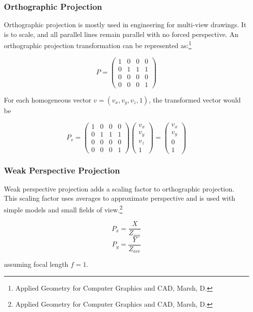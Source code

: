 \documentclass{article}
\begin{document}
\subsubsection{Orthographic Projection}
Orthographic projection is mostly used in engineering for multi-view drawings. It is to scale, and all parallel lines remain parallel with no forced perspective. An orthographic projection transformation can be represented as:\footnote{Applied Geometry for Computer Graphics and CAD, Marsh, D.}

\[ P = \begin{pmatrix}
  1 & 0 & 0 & 0 \\
  0 & 1 & 1 & 1 \\
  0 & 0 & 0 & 0 \\
  0 & 0 & 0 & 1 
 \end{pmatrix}\]	


For each homogeneous vector $v = (v_x, v_y, v_z, 1)$, the transformed vector would be

\[P_{v} = \begin{pmatrix}
  1 & 0 & 0 & 0 \\
  0 & 1 & 1 & 1 \\
  0 & 0 & 0 & 0 \\
  0 & 0 & 0 & 1 
 \end{pmatrix}	
\begin{pmatrix}
  v_{x} \\
  v_{y} \\
  v_{z} \\
  1
 \end{pmatrix}	
=
\begin{pmatrix}
  v_{x} \\
  v_{y} \\
  0 \\
  1
 \end{pmatrix}\]

\subsubsection{Weak Perspective Projection}
Weak perspective projection adds a scaling factor to orthographic projection. This scaling factor uses averages to approximate perspective and is used with simple models and small fields of view.\footnote{Applied Geometry for Computer Graphics and CAD, Marsh, D.}

  \[P_{x} =  \frac{X}{Z_{ave}}\]
  \[P_{y} =  \frac{Y}{Z_{ave}}\]

assuming focal length $f = 1$.
\end{document}
